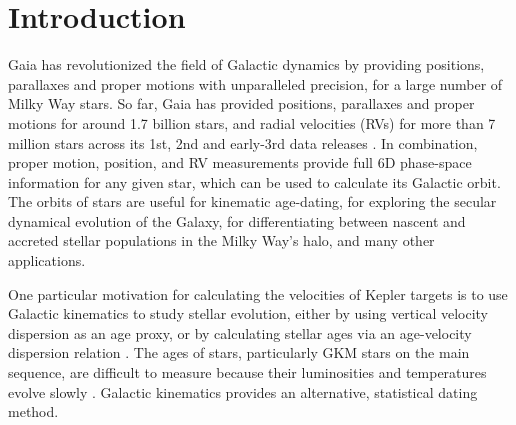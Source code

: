 \section{Introduction}

Gaia has revolutionized the field of Galactic dynamics by providing positions,
parallaxes and proper motions with unparalleled precision, for a large number
of Milky Way stars.
So far, Gaia has provided positions, parallaxes and proper motions for around
1.7 billion stars, and radial velocities (RVs) for more than 7 million stars
across its 1st, 2nd and early-3rd data releases \citep{gaia, gaia_dr2,
gaia_edr3}.
In combination, proper motion, position, and RV measurements provide full 6D
phase-space information for any given star, which can be used to calculate its
Galactic orbit.
The orbits of stars are useful for kinematic age-dating, for exploring the
secular dynamical evolution of the Galaxy, for differentiating between nascent
and accreted stellar populations in the Milky Way's halo, and many other
applications.

One particular motivation for calculating the velocities of Kepler targets is
to use Galactic kinematics to study stellar evolution, either by using
vertical velocity dispersion as an age proxy, or by calculating stellar ages
via an age-velocity dispersion relation \citep[\eg][]{angus2020, lu2021}.
The ages of stars, particularly GKM stars on the main sequence, are difficult
to measure because their luminosities and temperatures evolve slowly
\citep[see][for a review of stellar ages]{soderblom2010}.
Galactic kinematics provides an alternative, statistical dating method.


